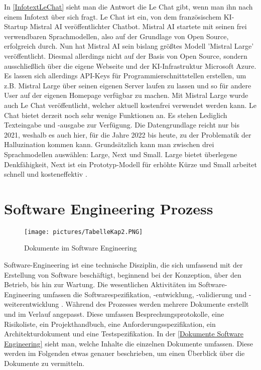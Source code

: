 In \autoref{InfotextLeChat} sieht man die Antwort die Le Chat gibt, wenn man ihn nach einem Infotext über sich 
fragt. Le Chat ist ein, von dem französischem KI-Startup Mistral AI veröffentlichter Chatbot. Mistral AI startete mit  
seinen frei verwendbaren Sprachmodellen, also auf der Grundlage von Open Source, erfolgreich durch. Nun  
hat Mistral AI sein bislang größtes Modell 'Mistral Large' veröffentlicht. Diesmal allerdings nicht auf der  
Basis von Open Source, sondern ausschließlich über die eigene Webseite und der KI-Infrastruktur Microsoft  
Azure. Es lassen sich allerdings API-Keys für Programmierschnittstellen erstellen, um z.B. Mistral Large über  
seinen eigenen Server laufen zu lassen und so für andere User auf der eigenen Homepage verfügbar zu machen.  
Mit Mistral Large wurde auch Le Chat veröffentlicht, welcher aktuell kostenfrei verwendet werden kann.
Le Chat bietet derzeit noch sehr wenige Funktionen an. Es stehen Lediglich Texteingabe und -ausgabe zur Verfügung.  
Die Datengrundlage reicht nur bis 2021, weshalb es auch hier, für die Jahre 2022 bis heute, zu der Problematik der  
Halluzination kommen kann.
Grundsätzlich kann man zwischen drei Sprachmodellen auswählen: Large, Next und Small. Large bietet überlegene Denkfähigkeit,  
Next ist ein Prototyp-Modell für erhöhte Kürze und Small arbeitet schnell und kosteneffektiv \cite{GrundlagenLeChat}.


\section{Software Engineering Prozess}

\begin{figure}
    \centering
    \texttt{[image: pictures/TabelleKap2.PNG]}
    \caption{Dokumente im Software Engineering}
    \label{Dokumente Software Engineering}
\end{figure}

Software-Engineering ist eine technische Disziplin, die sich umfassend mit der Erstellung von Software beschäftigt, 
beginnend bei der Konzeption, über den Betrieb, bis hin zur Wartung. Die wesentlichen Aktivitäten im 
Software-Engineering umfassen die Softwarespezifikation, -entwicklung, -validierung und -weiterentwicklung 
\cite{Sommerville10}. Während des Prozesses werden mehrere Dokumente erstellt und im Verlauf angepasst. 
Diese umfassen Besprechungsprotokolle, eine Risikoliste, ein Projekthandbuch, eine Anforderungsspezifikation, 
ein Architekturdokument und eine Testspezifikation. In der \autoref{Dokumente Software Engineering} sieht man, 
welche Inhalte die einzelnen Dokumente umfassen. Diese werden im Folgenden etwas genauer beschrieben, um einen 
Überblick über die Dokumente zu vermitteln.

